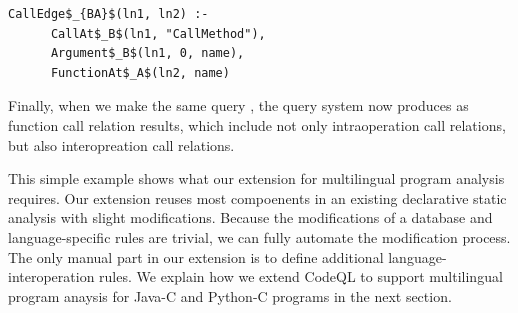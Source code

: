 
\begin{lstlisting}[style=mrule]
    CallEdge$_{BA}$(ln1, ln2) :-
      CallAt$_B$(ln1, "CallMethod"),
      Argument$_B$(ln1, 0, name),
      FunctionAt$_A$(ln2, name)
\end{lstlisting}

%

Finally, when we make the same query , the query system
now produces  as function call relation results,
which include not only intraoperation call relations,
but also interopreation call relations. 

This simple example shows what our extension for multilingual program analysis
requires. Our extension reuses most compoenents in an existing declarative static
analysis with slight modifications. Because the modifications of a database and
language-specific rules are trivial, we can fully automate the modification
process.  The only manual part in our extension is to define additional
language-interoperation rules. We explain how we extend CodeQL to support
multilingual program anaysis for Java-C and Python-C programs in the next section.


